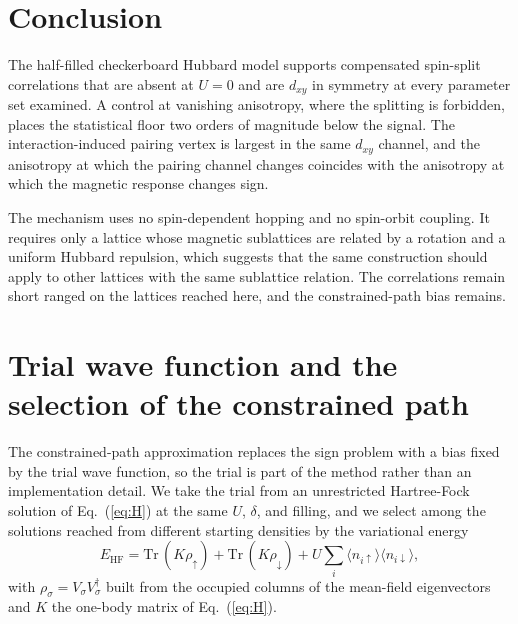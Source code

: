 \documentclass[aps,prb,reprint,superscriptaddress,amsmath,amssymb,floatfix]{revtex4-2}
\begin{document}
\section{Conclusion}
The half-filled checkerboard Hubbard model supports compensated spin-split
correlations that are absent at $U=0$ and are $d_{xy}$ in symmetry at every
parameter set examined. A control at vanishing anisotropy, where the splitting is
forbidden, places the statistical floor two orders of magnitude below the signal.
The interaction-induced pairing vertex is largest in the same $d_{xy}$ channel,
and the anisotropy at which the pairing channel changes coincides with the
anisotropy at which the magnetic response changes sign.

The mechanism uses no spin-dependent hopping and no spin-orbit coupling. It
requires only a lattice whose magnetic sublattices are related by a rotation and
a uniform Hubbard repulsion, which suggests that the same construction should
apply to other lattices with the same sublattice relation. The correlations
remain short ranged on the lattices reached here, and the constrained-path bias
remains.

\appendix

\section{Trial wave function and the selection of the constrained path}
\label{app:trial}

The constrained-path approximation replaces the sign problem with a bias fixed
by the trial wave function, so the trial is part of the method rather than an
implementation detail. We take the trial from an unrestricted Hartree-Fock
solution of Eq.~(\ref{eq:H}) at the same $U$, $\delta$, and filling, and we
select among the solutions reached from different starting densities by the
variational energy
\begin{equation}
E_{\mathrm{HF}} = \mathrm{Tr}\,(K \rho_{\uparrow}) + \mathrm{Tr}\,(K \rho_{\downarrow})
                + U \sum_i \langle n_{i\uparrow}\rangle \langle n_{i\downarrow}\rangle ,
\label{eq:ehf}
\end{equation}
with $\rho_{\sigma} = V_{\sigma} V_{\sigma}^{\dagger}$ built from the occupied
columns of the mean-field eigenvectors and $K$ the one-body matrix of
Eq.~(\ref{eq:H}).
\end{document}
